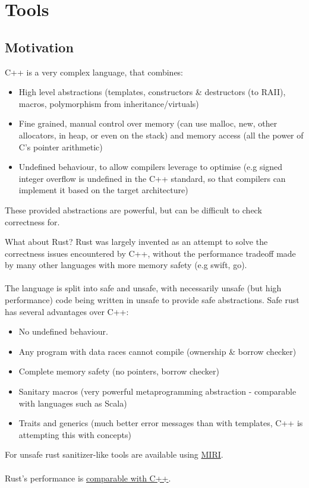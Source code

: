 \chapter{Tools}

\section{Motivation}
C++ is a very complex language, that combines:
\begin{itemize}
    \item High level abstractions (templates, constructors \& destructors (to RAII), macros, polymorphism from inheritance/virtuals)
    \item Fine grained, manual control over memory (can use malloc, new, other allocators, in heap, or even on the stack) and memory access (all the power of C's pointer arithmetic)
    \item Undefined behaviour, to allow compilers leverage to optimise (e.g signed integer overflow is undefined in the C++ standard, so that compilers can implement it based on the target architecture)  
\end{itemize}
These provided abstractions are powerful, but can be difficult to check correctness for.

\begin{sidenotebox}{What about Rust?}
    Rust was largely invented as an attempt to solve the correctness issues encountered by C++, without the performance tradeoff made by many other languages with more memory safety (e.g swift, go).
    \\
    \\ The language is split into safe and unsafe, with necessarily unsafe (but high performance) code being written in unsafe to provide safe abstractions. Safe rust has several advantages over C++:
    \begin{itemize}
        \item No undefined behaviour.
        \item Any program with data races cannot compile (ownership \& borrow checker)
        \item Complete memory safety (no pointers, borrow checker)
        \item Sanitary macros (very powerful metaprogramming abstraction - comparable with languages such as Scala)
        \item Traits and generics (much better error messages than with templates, C++ is attempting this with concepts)
    \end{itemize}
    For unsafe rust sanitizer-like tools are available using \href{https://github.com/rust-lang/miri}{MIRI}.
    \\
    \\ Rust's performance is \href{https://programming-language-benchmarks.vercel.app/cpp-vs-rust}{comparable with C++}.
\end{sidenotebox}

